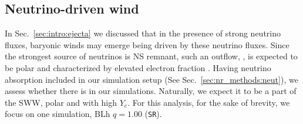 

\subsection{Neutrino-driven wind} \label{sec:bns_sims:nwind}




In Sec.~\ref{sec:intro:ejecta} we discussed that in the presence of strong 
neutrino fluxes, baryonic winds may emerge being driven by these neutrino fluxes.  
Since the strongest source of neutrinos is \ac{NS} remnant, such an outflow,
\nwind, is expected to be polar and characterized by elevated electron fraction 
\citep[\eg][]{Perego:2014fma}. 
%
Having neutrino absorption included in our simulation setup (See 
Sec.~\ref{sec:nr_methods:neut}), we assess whether there is \nwind{} in our 
simulations. Naturally, we expect it to be a part 
of the \ac{SWW}, polar and with high $Y_e$. 
%
For this analysis, for the sake of brevity, we focus on one 
simulation, BLh $q=1.00$ (\texttt{SR}). 


